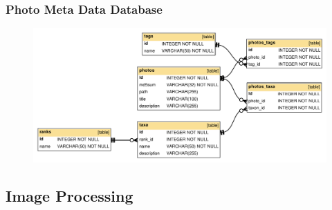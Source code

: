 \documentclass[]{beamer}
\begin{document}
    \begin{frame}
        \frametitle{Photo Meta Data Database}

        \begin{figure}[h]
        \centering
        \includegraphics[width=\textwidth]{meta-db-diagram}
        \end{figure}
    \end{frame}

    \subsection{Image Processing}
\end{document}
